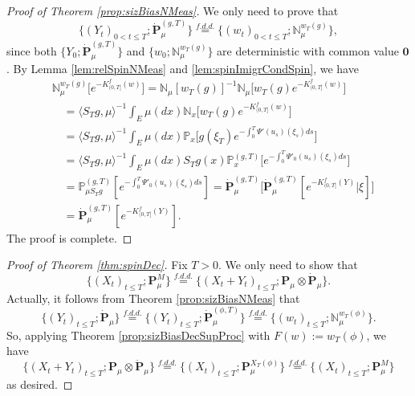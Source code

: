 \begin{proof}[Proof of Theorem \ref{prop:sizBiasNMeas}]
    We only need to prove that
\[
	\{(Y_t)_{0<t\le T}; \dot{\mathbf P}^{(g,T)}_\mu\}
	\overset{f.d.d.}{=} \{(w_t)_{0<t\le T}; \mathbb N_\mu^{w_T(g)}\},
\]
	since both $\{Y_0; \dot{\mathbf P}^{(g,T)}_\mu\}$ and $\{w_0; \mathbb N_\mu^{w_T(g)}\}$ are deterministic with common value $\mathbf 0$.
	By Lemma \ref{lem:relSpinNMeas} and \ref{lem:spinImigrCondSpin}, we have
\[\begin{split}
    &\mathbb N_\mu^{w_T(g)}\big[e^{-K_{(0, T]}^f(w)}\big]
	=\mathbb N_\mu[w_T(g)]^{-1} \mathbb N_\mu \big[w_T(g) e^{-K_{(0, T]}^f(w)}\big]\\
	&\quad =\langle S_Tg,\mu \rangle^{-1} \int_E \mu(dx) \mathbb N_x \big[w_T(g) e^{-K_{(0, T]}^f(w)}\big]\\
	&\quad =\langle S_Tg,\mu \rangle^{-1} \int_E \mu(dx) \mathbb P_x\big[g(\xi_T) e^{-\int_0^T \Psi'(u_s)(\xi_s) ds}\big]\\
	&\quad =\langle S_Tg,\mu \rangle^{-1} \int_E \mu(dx) S_Tg(x) \mathbb P^{(g,T)}_x \big[e^{-\int_0^T \Psi'_0(u_s)(\xi_s) ds}\big]\\
	&\quad =\mathbb P^{(g,T)}_{\mu S_Tg}[e^{-\int_0^T \Psi'_0(u_s)(\xi_s) ds}]
	=\dot {\mathbf P}^{(g,T)}_\mu\big[ \dot{\mathbf P}^{(g,T)}_\mu[e^{-K_{(0, T]}^f(Y)}|\xi] \big]\\
	&\quad = \dot{\mathbf P}^{(g,T)}_\mu[e^{-K_{(0, T]}^f(Y)}].
\end{split}\]
	The proof is complete.
\end{proof}
\begin{proof}[Proof of Theorem \ref{thm:spinDec}]
	Fix $T>0$.
	We only need to show that
\[
	\{(X_t)_{t\leq T}; \mathbf P_\mu^M\}
	\overset{f.d.d.}{=} \{(X_t + Y_t)_{t\leq T}; \mathbf P_\mu\otimes\dot{\mathbf P}_\mu\}.
\]
	Actually, it follows from Theorem \ref{prop:sizBiasNMeas} that
\[
	\{(Y_t)_{t\leq T}; \dot{\mathbf P}_\mu\}
	\overset{f.d.d.}{=} \{(Y_t)_{t\leq T}; \dot{\mathbf P}^{(\phi,T)}_\mu\}
	\overset{f.d.d.}{=} \{(w_t)_{t\leq T}; \mathbb N_\mu^{w_T(\phi)}\}.
\]
	So, applying Theorem \ref{prop:sizBiasDecSupProc}
	with $F(w) := w_T(\phi)$, we have
\[
	\{(X_t+Y_t)_{t\leq T}; \mathbf P_\mu\otimes\dot{\mathbf P}_\mu\}
	\overset{f.d.d.}{=} \{(X_t)_{t\leq T}; \mathbf P_\mu^{X_T(\phi)}\}
	\overset{f.d.d.}{=} \{(X_t)_{t\leq T}; \mathbf P_\mu^M\}
\]
	as desired.
\end{proof}

